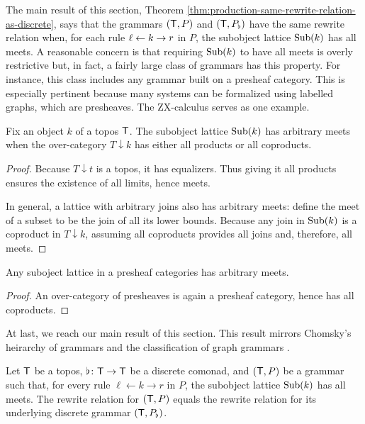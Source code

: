 \documentclass{amsart}
\begin{document}
The main result of this section, Theorem
\ref{thm:production-same-rewrite-relation-as-discrete},
says that the grammars $ ( \mathsf{T},P ) $ and
$ ( \mathsf{T},P_\flat ) $ have the same rewrite relation
when, for each rule $ \ell \leftarrow k \to r $ in $ P $,
the subobject lattice $ \operatorname{Sub}(k) $ has all meets. A
reasonable concern is that requiring $ \operatorname{Sub}(k) $
to have all meets is overly restrictive but, in
fact, a fairly large class of grammars has this
property. For instance, this class includes any grammar
built on a presheaf category.  This is especially
pertinent because many systems can be formalized
using labelled graphs, which are presheaves. The
ZX-calculus \cite{ZX} serves as one example.

\begin{proposition}
  \label{thm:subob-arbitrary-meets}
  Fix an object $k$ of a topos $ \mathsf{T} $.  The subobject
  lattice $ \operatorname{Sub} (k) $ has arbitrary meets when the
  over-category $ T \downarrow k $ has either all products or all coproducts.
\end{proposition}

\begin{proof}
  Because $ T \downarrow t $ is a topos, it has
  equalizers. Thus giving it all products ensures the
  existence of all limits, hence meets.

  In general, a lattice with arbitrary joins also has
  arbitrary meets: define the meet of a subset to be
  the join of all its lower bounds. Because any join in
  $ \operatorname{Sub} (k) $ is a coproduct in $ T \downarrow k $,
  assuming all coproducts provides all joins and, therefore,
  all meets.  
\end{proof}

\begin{corollary}
  Any suboject lattice in a presheaf categories has
  arbitrary meets.  
\end{corollary}

\begin{proof}
  An over-category of presheaves is again a presheaf
  category, hence has all coproducts.  
\end{proof}

At last, we reach our main result of this section.
This result mirrors Chomsky's heirarchy of
grammars \cite{Chomsky} and the classification of
graph grammars \cite[Prop.~3.3]{Ehrig_GraphGram}.

\begin{theorem}
  \label{thm:production-same-rewrite-relation-as-discrete}  
  Let $ \mathsf{T} $ be a topos, $ \flat \colon \mathsf{T} \to \mathsf{T} $
  be a discrete comonad, and $ ( \mathsf{T} , P ) $ be a
  grammar such that, for every rule
  $ \ell \gets k \to r $ in $ P $, the subobject
  lattice $ \operatorname{Sub} (k) $ has all meets. The rewrite
  relation for $ ( \mathsf{T} , P ) $ equals the rewrite
  relation for its underlying discrete grammar
  $ ( \mathsf{T},P_\flat ) $.
\end{theorem}
\end{document}
